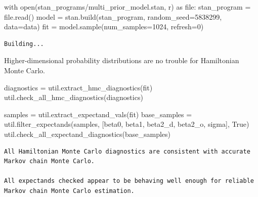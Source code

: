 \documentclass[
  letterpaper,
  DIV=11,
  numbers=noendperiod]{scrartcl}
\newenvironment{Shaded}{\begin{snugshade}}{\end{snugshade}}
\newcommand{\BuiltInTok}[1]{\textcolor[rgb]{0.00,0.23,0.31}{#1}}
\newcommand{\ControlFlowTok}[1]{\textcolor[rgb]{0.00,0.23,0.31}{#1}}
\newcommand{\DecValTok}[1]{\textcolor[rgb]{0.68,0.00,0.00}{#1}}
\newcommand{\ImportTok}[1]{\textcolor[rgb]{0.00,0.46,0.62}{#1}}
\newcommand{\NormalTok}[1]{\textcolor[rgb]{0.00,0.23,0.31}{#1}}
\newcommand{\OperatorTok}[1]{\textcolor[rgb]{0.37,0.37,0.37}{#1}}
\newcommand{\StringTok}[1]{\textcolor[rgb]{0.13,0.47,0.30}{#1}}
\newcommand{\VariableTok}[1]{\textcolor[rgb]{0.07,0.07,0.07}{#1}}
\begin{document}
\begin{Shaded}
\begin{Highlighting}[]
\ControlFlowTok{with} \BuiltInTok{open}\NormalTok{(}\StringTok{\textquotesingle{}stan\_programs/multi\_prior\_model.stan\textquotesingle{}}\NormalTok{, }\StringTok{\textquotesingle{}r\textquotesingle{}}\NormalTok{) }\ImportTok{as} \BuiltInTok{file}\NormalTok{:}
\NormalTok{  stan\_program }\OperatorTok{=} \BuiltInTok{file}\NormalTok{.read()}
\NormalTok{model }\OperatorTok{=}\NormalTok{ stan.build(stan\_program, random\_seed}\OperatorTok{=}\DecValTok{5838299}\NormalTok{, data}\OperatorTok{=}\NormalTok{data)}
\NormalTok{fit }\OperatorTok{=}\NormalTok{ model.sample(num\_samples}\OperatorTok{=}\DecValTok{1024}\NormalTok{, refresh}\OperatorTok{=}\DecValTok{0}\NormalTok{)}
\end{Highlighting}
\end{Shaded}

\begin{verbatim}
Building...
\end{verbatim}

Higher-dimensional probability distributions are no trouble for
Hamiltonian Monte Carlo.

\begin{Shaded}
\begin{Highlighting}[]
\NormalTok{diagnostics }\OperatorTok{=}\NormalTok{ util.extract\_hmc\_diagnostics(fit)}
\NormalTok{util.check\_all\_hmc\_diagnostics(diagnostics)}

\NormalTok{samples }\OperatorTok{=}\NormalTok{ util.extract\_expectand\_vals(fit)}
\NormalTok{base\_samples }\OperatorTok{=}\NormalTok{ util.filter\_expectands(samples,}
\NormalTok{                                      [}\StringTok{\textquotesingle{}beta0\textquotesingle{}}\NormalTok{, }\StringTok{\textquotesingle{}beta1\textquotesingle{}}\NormalTok{,}
                                       \StringTok{\textquotesingle{}beta2\_d\textquotesingle{}}\NormalTok{, }\StringTok{\textquotesingle{}beta2\_o\textquotesingle{}}\NormalTok{,}
                                       \StringTok{\textquotesingle{}sigma\textquotesingle{}}\NormalTok{],}
                                      \VariableTok{True}\NormalTok{)}
\NormalTok{util.check\_all\_expectand\_diagnostics(base\_samples)}
\end{Highlighting}
\end{Shaded}

\begin{verbatim}
All Hamiltonian Monte Carlo diagnostics are consistent with accurate
Markov chain Monte Carlo.
 
All expectands checked appear to be behaving well enough for reliable
Markov chain Monte Carlo estimation.
 
\end{verbatim}
\end{document}
